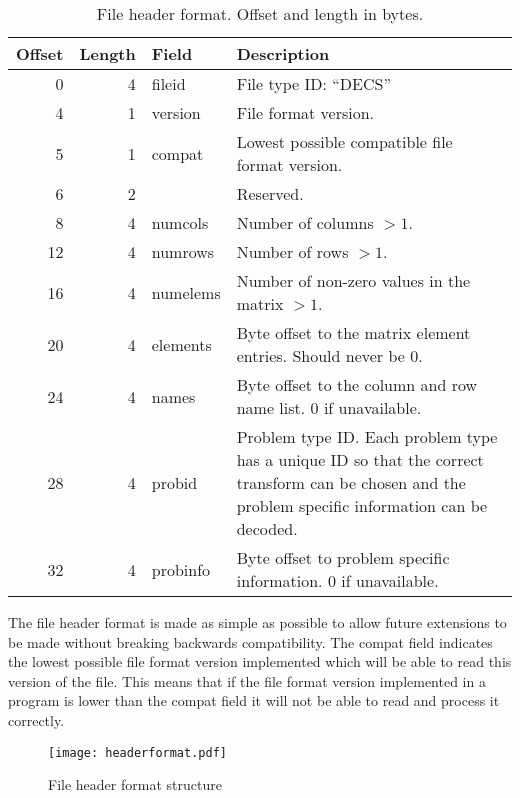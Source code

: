 \begin{table}[htbp]
	\centering
	\begin{tabular}{|r|r|l|p{2.6in}|}
		\hline
		\bf Offset & \bf Length & \bf Field & \bf Description \\ \hline
		0  & 4 & fileid & File type ID: ``DECS'' \\ \hline
		4  & 1 & version & File format version. \\ \hline
		5  & 1 & compat & Lowest possible compatible file format version. \\ \hline
		6  & 2 & & Reserved. \\ \hline
		8  & 4 & numcols & Number of columns $> 1$. \\ \hline
		12 & 4 & numrows & Number of rows $> 1$. \\ \hline
		16 & 4 & numelems & Number of non-zero values in the matrix $> 1$. \\ \hline
		20 & 4 & elements & Byte offset to the matrix element entries. Should never be 0. \\ \hline
		24 & 4 & names & Byte offset to the column and row name list. 0 if unavailable. \\ \hline
		28 & 4 & probid & Problem type ID. Each problem type has a unique ID so that the correct transform can be chosen and the problem specific information can be decoded. \\ \hline
		32 & 4 & probinfo & Byte offset to problem specific information. 0 if unavailable. \\ \hline
	\end{tabular}
	\caption{File header format. Offset and length in bytes.}
	\label{tab:header}
\end{table}

The file header format is made as simple as possible to allow future extensions to be made without breaking backwards compatibility.
The compat field indicates the lowest possible file format version implemented which will be able to read this version of the file.
This means that if the file format version implemented in a program is lower than the compat field it will not be able to read and process it correctly.

\begin{figure}[htb]
	\centering
	\texttt{[image: headerformat.pdf]}
	\caption{File header format structure}
	\label{fig:header}
\end{figure}


